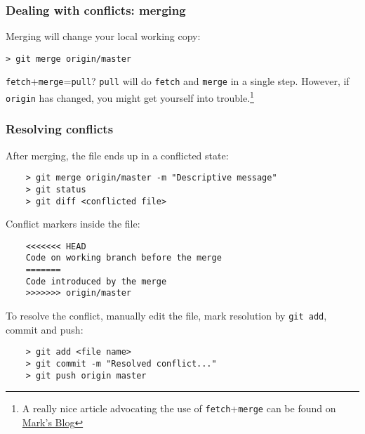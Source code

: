 
\begin{frame}[fragile]
	\frametitle{Dealing with conflicts: merging}
	
	Merging will change your local working copy:
	\begin{verbatim}
> git merge origin/master
	\end{verbatim}
	
	\begin{block}{\texttt{fetch}+\texttt{merge}=\texttt{pull}?}
	\texttt{pull} will do \texttt{fetch} and \texttt{merge} in a single step. However, if \texttt{origin} has changed, you might get yourself into trouble.\footnote{A really nice article advocating the use of \texttt{fetch}+\texttt{merge} can be found on \href{http://longair.net/blog/2009/04/16/git-fetch-and-merge/}{Mark's Blog}} 
	\end{block}
	
\end{frame}

\begin{frame}[fragile]
	\frametitle{Resolving conflicts}
	
	After merging, the file ends up in a conflicted state:
	\begin{verbatim}
	> git merge origin/master -m "Descriptive message"
	> git status
	> git diff <conflicted file>	
	\end{verbatim}	
	
	Conflict markers inside the file:
	\begin{verbatim}
	<<<<<<< HEAD
	Code on working branch before the merge
	=======
	Code introduced by the merge
	>>>>>>> origin/master
	\end{verbatim}

	To resolve the conflict, manually edit the file, mark resolution by \texttt{git add}, commit and push:
	\begin{verbatim}
	> git add <file name>
	> git commit -m "Resolved conflict..."
	> git push origin master
	\end{verbatim}
	
\end{frame}




